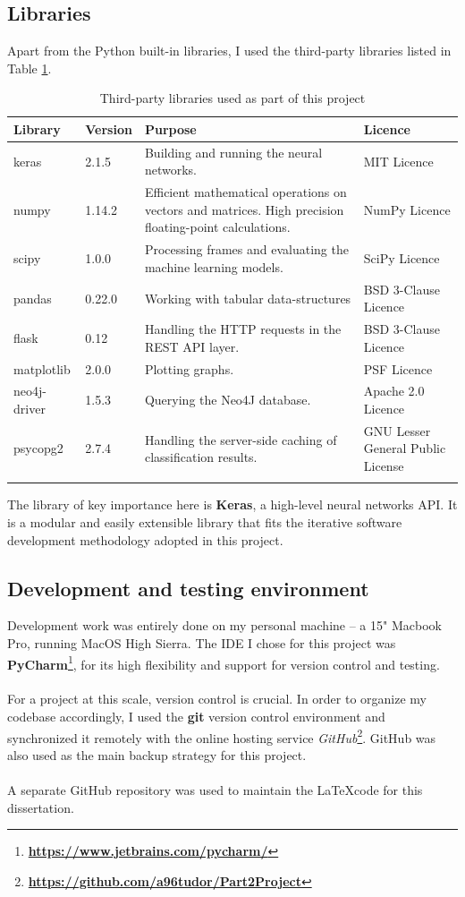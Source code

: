 	\subsection{Libraries} \label{Section 2.5.2}
	Apart from the Python built-in libraries, I used the third-party libraries listed in Table \ref{Table 2.3}. 
	\begin{longtable}{|p{} p{} p{} p{}|}
		\textbf{Library} & \textbf{Version} & \textbf{Purpose} & \textbf{Licence}\\
		\hline
		keras & 2.1.5 & Building and running the neural networks. & MIT Licence \\
		numpy & 1.14.2 & Efficient mathematical operations on vectors and matrices. High precision floating-point calculations. & NumPy Licence\\
		scipy & 1.0.0 & Processing frames and evaluating the machine learning models. & SciPy Licence\\
		pandas & 0.22.0 & Working with tabular data-structures & BSD 3-Clause Licence\\
		flask & 0.12 & Handling the HTTP requests in the REST API layer. & BSD 3-Clause Licence\\
		matplotlib & 2.0.0 & Plotting graphs. & PSF Licence \\
		neo4j-driver & 1.5.3 & Querying the Neo4J database. & Apache 2.0 Licence\\
		psycopg2 & 2.7.4 & Handling the server-side caching of classification results. &  GNU Lesser General Public License\\
		\hline
		\caption[Libaries table]{\centering Third-party libraries used as part of this project}
		\label{Table 2.3}
	\end{longtable} 
	The library of key importance here is \textbf{Keras}, a high-level neural networks API. It is a modular and easily extensible library that fits the iterative software development methodology adopted in this project.
	\subsection{Development and testing environment}
	Development work was entirely done on my personal machine -- a 15" Macbook Pro, running MacOS High Sierra. The IDE I chose for this project was \textbf{PyCharm}\footnote{\textbf{\url{https://www.jetbrains.com/pycharm/}}}, for its high flexibility and support for version control and testing.
	\\ \\
	For a project at this scale, version control is crucial. In order to organize my codebase accordingly, I used the \textbf{git} version control environment and synchronized it remotely with the online hosting service \textit{GitHub}\footnote{\textbf{\url{https://github.com/a96tudor/Part2Project}}}. GitHub was also used as the main backup strategy for this project.
	\\ \\
	A separate GitHub repository was used to maintain the \LaTeX \space code for this dissertation. 
	
